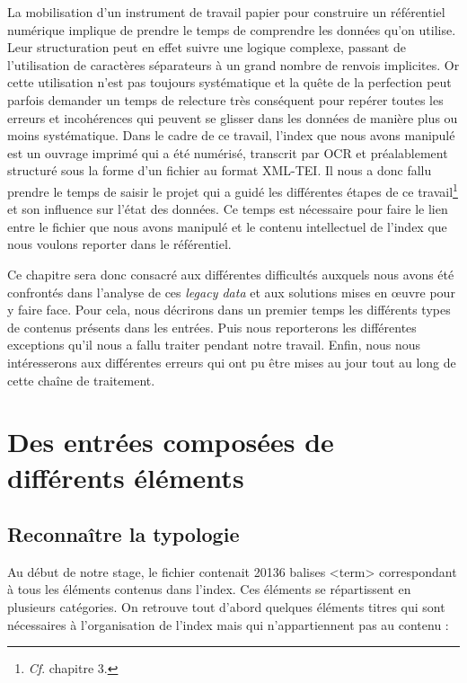\documentclass[a4paper,12pt,twoside]{book}
\begin{document}
	La mobilisation d'un instrument de travail papier pour construire un référentiel numérique implique de prendre le temps de comprendre les données qu'on utilise. Leur structuration peut en effet suivre une logique complexe, passant de l'utilisation de caractères séparateurs à un grand nombre de renvois implicites. Or cette utilisation n'est pas toujours systématique et la quête de la perfection peut parfois demander un temps de relecture très conséquent pour repérer toutes les erreurs et incohérences qui peuvent se glisser dans les données de manière plus ou moins systématique. Dans le cadre de ce travail, l'index que nous avons manipulé est un ouvrage imprimé qui a été numérisé, transcrit par OCR et préalablement structuré sous la forme d'un fichier au format XML-TEI. Il nous a donc fallu prendre le temps de saisir le projet qui a guidé les différentes étapes de ce travail\footnote{\textit{Cf}. chapitre 3.} et son influence sur l'état des données. Ce temps est nécessaire pour faire le lien entre le fichier que nous avons manipulé et le contenu intellectuel de l'index que nous voulons reporter dans le référentiel.
	
	Ce chapitre sera donc consacré aux différentes difficultés auxquels nous avons été confrontés dans l'analyse de ces \textit{legacy data} et aux solutions mises en œuvre pour y faire face. Pour cela, nous décrirons dans un premier temps les différents types de contenus présents dans les entrées. Puis nous reporterons les différentes exceptions qu'il nous a fallu traiter pendant notre travail. Enfin, nous nous intéresserons aux différentes erreurs qui ont pu être mises au jour tout au long de cette chaîne de traitement.
	
	\section{Des entrées composées de différents éléments}
	
	\subsection{Reconnaître la typologie}
	
	Au début de notre stage, le fichier contenait 20136 balises <term> correspondant à tous les éléments contenus dans l'index. Ces éléments se répartissent en plusieurs catégories. On retrouve tout d'abord quelques éléments titres qui sont nécessaires à l'organisation de l'index mais qui n'appartiennent pas au contenu :
	
\end{document}
